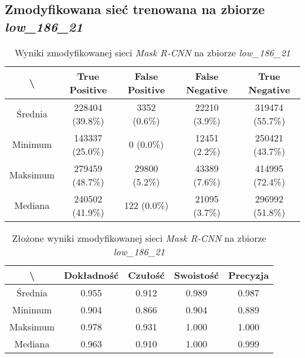 \subsection{Zmodyfikowana sieć trenowana na zbiorze \textit{low\_186\_21}}
\lowprocent

\begin{table}[H]
	\centering
	\caption{Wyniki zmodyfikowanej sieci \textit{Mask R-CNN} na zbiorze \textit{low\_186\_21}}
	\vspace{6pt}
	{\footnotesize
		\begin{tabular}{|c|c|c|c|c|}
      \hline \textbackslash & True Positive & False Positive & False Negative & True Negative \\
      \hline Średnia & 228404 (39.8\%) & 3352 (0.6\%) & 22210 (3.9\%) & 319474 (55.7\%) \\
      \hline Minimum & 143337 (25.0\%) & 0 (0.0\%) & 12451 (2.2\%) & 250421 (43.7\%) \\
      \hline Maksimum & 279459 (48.7\%) & 29800 (5.2\%) & 43389 (7.6\%) & 414995 (72.4\%) \\
      \hline Mediana & 240502 (41.9\%) & 122 (0.0\%) & 21095 (3.7\%) & 296992 (51.8\%) \\
      \hline
		\end{tabular}
	}
  \vspace{0pt}
  \label{Tab:low_modified}
\end{table}


\begin{table}[H]
	\centering
	\caption{Złożone wyniki zmodyfikowanej sieci \textit{Mask R-CNN} na zbiorze \textit{low\_186\_21}}
	\vspace{6pt}
	{\footnotesize
		\begin{tabular}{|c|c|c|c|c|}
      \hline \textbackslash & Dokładność & Czułość & Swoistość & Precyzja \\
      \hline Średnia & 0.955 & 0.912 & 0.989 & 0.987 \\
      \hline Minimum & 0.904 & 0.866 & 0.904 & 0.889 \\
      \hline Maksimum & 0.978 & 0.931 & 1.000 & 1.000 \\
      \hline Mediana & 0.963 & 0.910 & 1.000 & 0.999 \\
      \hline
		\end{tabular}
	}
  \vspace{0pt}
  \label{Tab:low_modified_calculated}
\end{table}

